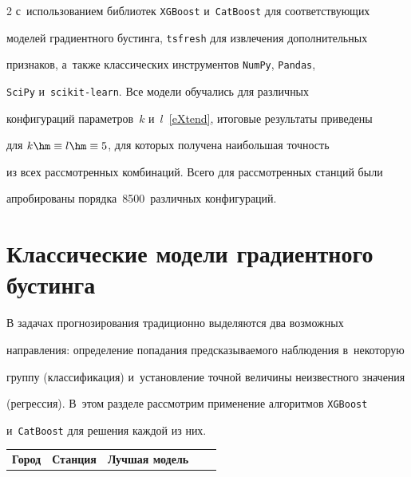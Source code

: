\begin{multicols}{2}
с~использованием биб\-лио\-тек \verb"XGBoost" и~\verb"CatBoost" для со\-от\-вет\-ст\-ву\-ющих 

моделей градиентного бустинга, \verb"tsfresh" для извлечения дополнительных 

признаков, а~так\-же классических инструментов \verb"NumPy", \verb"Pandas", 

\verb"SciPy" и~\verb"scikit-learn". Все модели обучались для различных 

конфигураций па\-ра\-мет\-ров~$k$ и~$l$~\eqref{eXtend}, итоговые результаты приведены 

для $k \hm\equiv l \hm \equiv 5$, для которых получена наибольшая точность 

из всех рассмотренных комбинаций. Всего для рассмотренных станций были 

апробированы порядка~8500~различных конфигураций.



\section{Классические модели градиентного бустинга}



В задачах прогнозирования традиционно выделяются два возможных 

направления: определение попадания предсказываемого наблюдения в~некоторую 

группу (классификация) и~установление точной величины неизвестного значения 

(регрессия). В~этом разделе рассмотрим применение алгоритмов \verb"XGBoost" 

и~\verb"CatBoost" для решения каждой из них.



\setcounter{table}{2}

\begin{table}[b]\small %

\begin{center}


\vspace*{2ex}



\begin{tabular}{|l|c|l|c|c|}

\hline

\multicolumn{1}{|c|}{{\bf Город}} & 

\multicolumn{1}{c|}{{\bf Станция}} & {\bf Лучшая модель} & 


\end{tabular}
\end{center}
\end{table}
\end{multicols}
